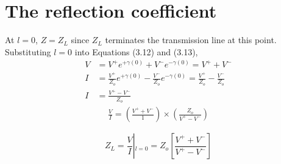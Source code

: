\section{The reflection coefficient}
At $l = 0$, $Z = Z_L$ since $Z_L$ terminates the transmission line at this point. Substituting $l = 0$ into Equations (3.12) and (3.13),
\begin{align*}
V &= V^+e^{+\gamma (0)}+V^-e^{-\gamma (0)} = V^+ + V^-\\
I &= \frac{V^+}{Z_o}e^{+\gamma (0)}-\frac{V^-}{Z_o}e^{-\gamma (0)} = \frac{V^+}{Z_o} - \frac{V^-}{Z_o} \\
I &= \frac{V^+ - V^-}{Z_o}
\end{align*}
\begin{align*}
\frac{V}{I} = \left( \frac{V^+ + V^-}{1}\right)  \times \left( \frac{Z_o}{V^+ - V^-}\right) 
\end{align*}

\begin{equation*}
	Z_{L} = \frac{V}{I}\left|_{l = 0} = Z_{o} \left[ \frac{V^+ + V^-}{V^+ - V^-} \right]\right.    
\end{equation*}

